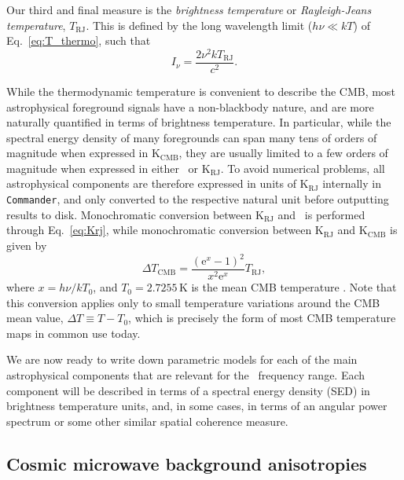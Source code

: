 \documentclass[onecolumn]{aa}
\def\commander{\texttt{Commander}}
\newcommand{\e}{\mathrm e}
\begin{document}
Our third and final measure is the \emph{brightness temperature} or
\emph{Rayleigh-Jeans temperature}, $T_{\mathrm{RJ}}$. This is defined
by the long wavelength limit ($h\nu \ll kT$) of
Eq.~\eqref{eq:T_thermo}, such that
\begin{equation}
  I_{\nu} = \frac{2\nu^2kT_{\mathrm{RJ}}}{c^2}.
  \label{eq:Krj}
\end{equation}

While the thermodynamic temperature is convenient to describe the CMB,
most astrophysical foreground signals have a non-blackbody nature, and
are more naturally quantified in terms of brightness temperature. In
particular, while the spectral energy density of many foregrounds can
span many tens of orders of magnitude when expressed in
$\mathrm{K_{CMB}}$, they are usually limited to a few orders of
magnitude when expressed in either \MJysr\ or
$\textrm{K}_{\mathrm{RJ}}$. To avoid numerical problems, all
astrophysical components are therefore expressed in units of
$\textrm{K}_{\mathrm{RJ}}$ internally in \commander, and only
converted to the respective natural unit before outputting results to
disk. Monochromatic conversion between $\mathrm{K}_{\mathrm{RJ}}$ and
\MJysr\ is performed through Eq.~\eqref{eq:Krj}, while monochromatic
conversion between $\mathrm{K}_{\mathrm{RJ}}$ and
$\mathrm{K}_{\mathrm{CMB}}$ is given by
\begin{equation}
  \Delta T_{\mathrm{CMB}} = \frac{\left(\e^{x}-1\right)^2}{x^2\e^{x}}
  T_{\mathrm{RJ}},
  \label{eq:rj2cmb}
\end{equation}
where $x=h\nu/kT_{0}$, and $T_0 = 2.7255\,\mathrm{K}$ is the mean CMB
temperature \citep{fixsen2009}. Note that this conversion applies only
to small temperature variations around the CMB mean value, $\Delta T
\equiv T - T_0$, which is precisely the form of most CMB temperature
maps in common use today.

We are now ready to write down parametric models for each of the main
astrophysical components that are relevant for the \Planck\ frequency
range. Each component will be described in terms of a spectral energy
density (SED) in brightness temperature units, and, in some cases, in terms of an
angular power spectrum or some other similar spatial coherence
measure.

\subsection{Cosmic microwave background anisotropies}
\label{sec:cmb}
\end{document}
